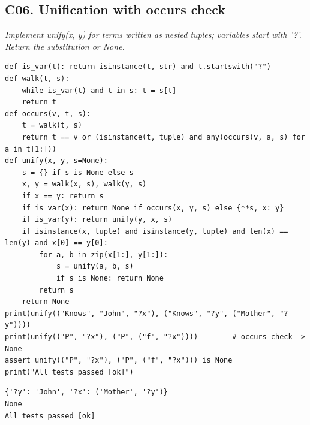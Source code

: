 \documentclass[11pt]{article}
\begin{document}
\subsection*{C06. Unification with occurs check \hfill{}}
\textit{Implement unify(x, y) for terms written as nested tuples; variables start with '?'. Return the substitution or None.}
\begin{lstlisting}[style=py]
def is_var(t): return isinstance(t, str) and t.startswith("?")
def walk(t, s):
    while is_var(t) and t in s: t = s[t]
    return t
def occurs(v, t, s):
    t = walk(t, s)
    return t == v or (isinstance(t, tuple) and any(occurs(v, a, s) for a in t[1:]))
def unify(x, y, s=None):
    s = {} if s is None else s
    x, y = walk(x, s), walk(y, s)
    if x == y: return s
    if is_var(x): return None if occurs(x, y, s) else {**s, x: y}
    if is_var(y): return unify(y, x, s)
    if isinstance(x, tuple) and isinstance(y, tuple) and len(x) == len(y) and x[0] == y[0]:
        for a, b in zip(x[1:], y[1:]):
            s = unify(a, b, s)
            if s is None: return None
        return s
    return None
print(unify(("Knows", "John", "?x"), ("Knows", "?y", ("Mother", "?y"))))
print(unify(("P", "?x"), ("P", ("f", "?x"))))        # occurs check -> None
assert unify(("P", "?x"), ("P", ("f", "?x"))) is None
print("All tests passed [ok]")
\end{lstlisting}
\begin{lstlisting}[style=out]
{'?y': 'John', '?x': ('Mother', '?y')}
None
All tests passed [ok]
\end{lstlisting}
\end{document}
